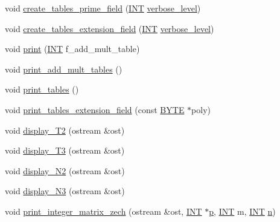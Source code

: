 \begin{DoxyCompactItemize}
\item 
void \mbox{\hyperlink{classfinite__field_a811a41cf0e334c7c05725afa19d79b7a}{create\+\_\+tables\+\_\+prime\+\_\+field}} (\mbox{\hyperlink{galois_8h_a09fddde158a3a20bd2dcadb609de11dc}{I\+NT}} \mbox{\hyperlink{simeon_8_c_a818073fbcc2f439e7c56952f67386122}{verbose\+\_\+level}})
\item 
void \mbox{\hyperlink{classfinite__field_ac5067ade796759e81d55cd3d434f8512}{create\+\_\+tables\+\_\+extension\+\_\+field}} (\mbox{\hyperlink{galois_8h_a09fddde158a3a20bd2dcadb609de11dc}{I\+NT}} \mbox{\hyperlink{simeon_8_c_a818073fbcc2f439e7c56952f67386122}{verbose\+\_\+level}})
\item 
void \mbox{\hyperlink{classfinite__field_a447940f58fdec6c099784a3e50501926}{print}} (\mbox{\hyperlink{galois_8h_a09fddde158a3a20bd2dcadb609de11dc}{I\+NT}} f\+\_\+add\+\_\+mult\+\_\+table)
\item 
void \mbox{\hyperlink{classfinite__field_ac4f687830f2953f9f7568c541e3e91c7}{print\+\_\+add\+\_\+mult\+\_\+tables}} ()
\item 
void \mbox{\hyperlink{classfinite__field_aa0bddbd3f44fb6012a198bfc3d0551fc}{print\+\_\+tables}} ()
\item 
void \mbox{\hyperlink{classfinite__field_a026b98a814f71c1bfbd6905abb295ee8}{print\+\_\+tables\+\_\+extension\+\_\+field}} (const \mbox{\hyperlink{galois_8h_ab6cc7b4aeb6ea31aba2b3fbfc83ff5e6}{B\+Y\+TE}} $\ast$poly)
\item 
void \mbox{\hyperlink{classfinite__field_a73592a477a519c7823666db81c18a5a9}{display\+\_\+\+T2}} (ostream \&ost)
\item 
void \mbox{\hyperlink{classfinite__field_a58abf6314463f2b93247a3c467a7bcd3}{display\+\_\+\+T3}} (ostream \&ost)
\item 
void \mbox{\hyperlink{classfinite__field_ad66c70d4957af58f1ba0652bc8ece5f0}{display\+\_\+\+N2}} (ostream \&ost)
\item 
void \mbox{\hyperlink{classfinite__field_a4fe5992dc30abce53c6a86d6e3a666a8}{display\+\_\+\+N3}} (ostream \&ost)
\item 
void \mbox{\hyperlink{classfinite__field_a35f0fb6cff75994cf14bf1aace421862}{print\+\_\+integer\+\_\+matrix\+\_\+zech}} (ostream \&ost, \mbox{\hyperlink{galois_8h_a09fddde158a3a20bd2dcadb609de11dc}{I\+NT}} $\ast$\mbox{\hyperlink{classfinite__field_a6ade6bf60b02c28de9e4b3b7015badb5}{p}}, \mbox{\hyperlink{galois_8h_a09fddde158a3a20bd2dcadb609de11dc}{I\+NT}} m, \mbox{\hyperlink{galois_8h_a09fddde158a3a20bd2dcadb609de11dc}{I\+NT}} \mbox{\hyperlink{simeon_8_c_a7f2cd26777ce0ff3fdaf8d02aacbddfb}{n}})

\end{DoxyCompactItemize}

